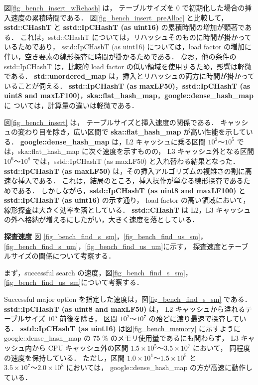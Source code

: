 図\ref{fig_bench_insert_wRehash} は，
テーブルサイズを 0 で初期化した場合の挿入速度の累積時間である．
図\ref{fig_bench_insert_preAlloc} と比較して，
{\bf sstd::CHashT} と {\bf sstd::IpCHashT (as uint16)} の累積時間の増加が顕著である．
これは，sstd::CHashT については，リハッシュそのものに時間が掛かっているためであり，
sstd::IpCHashT (as uint16) については，load factor の増加に伴い，空き要素の線形探査に時間が掛かるためである．
なお，他の条件の sstd::IpCHashT は，比較的 load factor の低い領域を使用するため，影響は軽微である．
{\bf std::unordered\_map} は，挿入とリハッシュの両方に時間が掛かっていることが伺える．
{\bf sstd::IpCHashT (as maxLF50)}，{\bf sstd::IpCHashT (as uint8 and maxLF100)}，{\bf ska::flat\_hash\_map}，{\bf google::dense\_hash\_map} に
ついては，計算量の違いは軽微である．

図\ref{fig_bench_insert} は，
テーブルサイズと挿入速度の関係である．
キャッシュの変わり目を除き，広い区間で {\bf ska::flat\_hash\_map} が高い性能を示している．
{\bf google::dense\_hash\_map} は，L2 キャッシュに乗る区間 $10^2〜 10^5$ では，ska::flat\_hash\_map に次ぐ速度を示すものの，
L3 キャッシュ外となる区間 $10^6〜 10^8$ では，sstd::IpCHashT (as maxLF50) と入れ替わる結果となった．
{\bf sstd::IpCHashT (as maxLF50)} は，その挿入アルゴリズムの複雑さの割に高速な挿入である．
これは，結局のところ，挿入操作が単なる線形探査であるためである．
しかしながら，{\bf sstd::IpCHashT (as uint8 and maxLF100)} と {\bf sstd::IpCHashT (as uint16)} の示す通り，
load factor の高い領域において，線形探査は大きく効率を落としている．
{\bf sstd::CHashT} は L2，L3 キャッシュの外へ格納が増えるにしたがい，大きく速度を落としている．
\leavevmode \newline

%
{\bf 探査速度}
\samepage\newline\indent
図
\ref{fig_bench_find_s_sm}，\ref{fig_bench_find_us_sm}，
\ref{fig_bench_find_s_um}，\ref{fig_bench_find_us_um}に示す，
探査速度とテーブルサイズの関係について考察する．

まず，successful search の速度，図\ref{fig_bench_find_s_sm}，\ref{fig_bench_find_us_sm}について考察する．

Successful major option を指定した速度は，図\ref{fig_bench_find_s_sm} である．
{\bf sstd::IpCHashT (as uint8 and maxLF50)} は，
L2 キャッシュから溢れるテーブルサイズ $10^5$ 前後を除き，
区間 $10^2〜10^7$ の殆どに渡り最速で探査している．
{\bf sstd::IpCHashT (as uint16)} は図\ref{fig_bench_memory} に示すように
google::dense\_hash\_map の 75 \% のメモリ使用量であるにも関わらず，
L3 キャッシュ内から CPU キャッシュ外の区間 $1.5\times10^5〜3.5\times10^7$ において，
同程度の速度を保持している．
ただし，区間 $1.0\times10^1〜1.5\times10^5$ と $3.5\times10^7〜2.0\times10^8$ においては，
google::dense\_hash\_map の方が高速に動作している．

